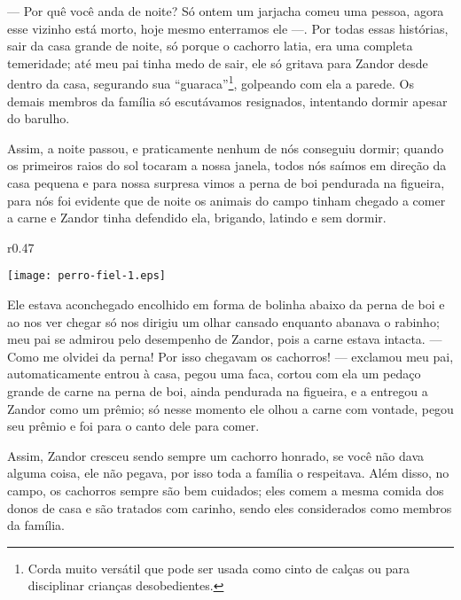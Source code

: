 --- Por quê você anda de noite? Só ontem um jarjacha comeu uma pessoa, agora esse vizinho está morto, hoje mesmo enterramos ele ---.
Por todas essas histórias, sair da casa grande de noite, só porque o cachorro latia, era uma completa temeridade; até meu pai tinha medo de sair, ele só gritava para Zandor desde dentro da casa, segurando sua ``guaraca''\footnote{Corda muito versátil que pode ser usada como cinto de calças ou para disciplinar crianças desobedientes.}, golpeando com ela a parede. 
Os demais membros da família só escutávamos resignados, intentando dormir apesar do barulho.

Assim, a noite passou, e praticamente nenhum de nós conseguiu dormir; quando os primeiros raios do sol tocaram a nossa janela, todos nós saímos em direção da casa pequena e para nossa surpresa vimos a perna de boi pendurada na figueira, para nós foi evidente que de noite os animais do campo tinham chegado a comer a carne e Zandor tinha defendido ela, brigando, latindo e sem dormir. 
\begin{wrapfigure}{r}{0.47\textwidth}
  \begin{center}
  \vspace{-0.5cm}
    \texttt{[image: perro-fiel-1.eps]}
  \end{center}
  \vspace{-0.5cm}
\end{wrapfigure}
Ele estava aconchegado encolhido em forma de bolinha abaixo da perna de boi e ao nos ver chegar só nos dirigiu um olhar cansado enquanto abanava o rabinho; meu pai se admirou pelo desempenho de Zandor, pois a carne estava intacta. 
--- Como me olvidei da perna! Por isso chegavam os cachorros! --- exclamou meu pai, 
automaticamente entrou à casa, pegou uma faca, cortou com ela um pedaço grande de carne na perna de boi, ainda pendurada na figueira, e a entregou a Zandor como um prêmio; só nesse momento ele olhou a carne com vontade, pegou seu prêmio e foi para o canto dele para comer.

Assim, Zandor cresceu sendo sempre um cachorro honrado, se você não dava alguma coisa, ele não pegava, por isso toda a família o respeitava. Além disso, no campo, os cachorros sempre são bem cuidados; eles comem a mesma comida dos donos de casa e são tratados com carinho, sendo eles considerados como membros da família.


